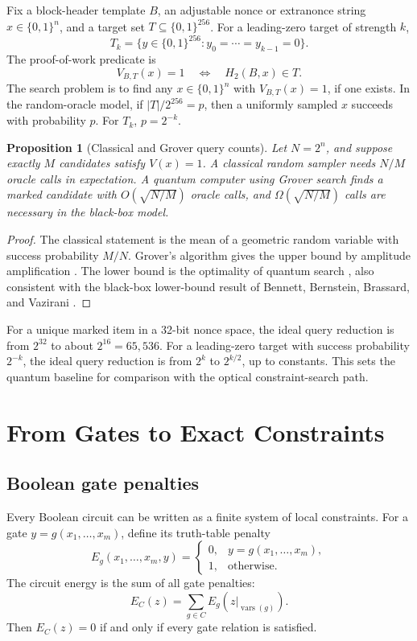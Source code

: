 \documentclass[11pt]{article}
\newtheorem{proposition}[theorem]{Proposition}
\theoremstyle{definition}
\theoremstyle{remark}
\newcommand{\bits}{\{0,1\}}
\begin{document}
Fix a block-header template \(B\), an adjustable nonce or extranonce string
\(x\in\bits^n\), and a target set \(T\subseteq\bits^{256}\). For a leading-zero
target of strength \(k\),
\[
T_k=\{y\in\bits^{256}:y_0=\cdots=y_{k-1}=0\}.
\]
The proof-of-work predicate is
\[
V_{B,T}(x)=1\quad\Longleftrightarrow\quad H_2(B,x)\in T.
\]
The search problem is to find any \(x\in\bits^n\) with \(V_{B,T}(x)=1\), if one
exists. In the random-oracle model, if \(|T|/2^{256}=p\), then a uniformly
sampled \(x\) succeeds with probability \(p\). For \(T_k\), \(p=2^{-k}\).

\begin{proposition}[Classical and Grover query counts]
\label{prop:querycounts}
Let \(N=2^n\), and suppose exactly \(M\) candidates satisfy \(V(x)=1\). A
classical random sampler needs \(N/M\) oracle calls in expectation. A quantum
computer using Grover search finds a marked candidate with \(O(\sqrt{N/M})\)
oracle calls, and \(\Omega(\sqrt{N/M})\) calls are necessary in the black-box
model.
\end{proposition}

\begin{proof}
The classical statement is the mean of a geometric random variable with success
probability \(M/N\). Grover's algorithm gives the upper bound by amplitude
amplification \cite{Grover1997}. The lower bound is the optimality of quantum
search \cite{Zalka1999}, also consistent with the black-box lower-bound result
of Bennett, Bernstein, Brassard, and Vazirani \cite{BBBV1997}.
\end{proof}

For a unique marked item in a 32-bit nonce space, the ideal query reduction is
from \(2^{32}\) to about \(2^{16}=65{,}536\). For a leading-zero target with
success probability \(2^{-k}\), the ideal query reduction is from \(2^k\) to
\(2^{k/2}\), up to constants. This sets the quantum baseline for comparison with
the optical constraint-search path.

\section{From Gates to Exact Constraints}

\subsection{Boolean gate penalties}

Every Boolean circuit can be written as a finite system of local constraints.
For a gate \(y=g(x_1,\ldots,x_m)\), define its truth-table penalty
\[
E_g(x_1,\ldots,x_m,y)=
\begin{cases}
0,&y=g(x_1,\ldots,x_m),\\
1,&\text{otherwise}.
\end{cases}
\]
The circuit energy is the sum of all gate penalties:
\[
E_C(z)=\sum_{g\in C}E_g(z|_{\operatorname{vars}(g)}).
\]
Then \(E_C(z)=0\) if and only if every gate relation is satisfied.
\end{document}
